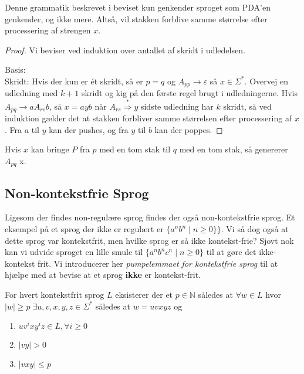 \begin{claim}
	Denne grammatik beskrevet i beviset kun genkender sproget som PDA'en genkender, og ikke mere. Altså, vil stakken forblive samme størrelse efter processering af strengen $x$.
\end{claim}

\begin{proof}
	Vi beviser ved induktion over antallet af skridt i udledelsen.

	Basis:\\ %
	 Skridt: Hvis der kun er ét skridt, så er $p = q$ og $A_{pp} \rightarrow \varepsilon$ så $x \in \Sigma^{*}$.
	Overvej en udledning med $k+1$ skridt og kig på den første regel brugt i udledningerne. Hvis $A_{pq} \rightarrow aA_{rs}b$, så $x = ayb$ når $A_{rs} \stackrel{*}{\Rightarrow} y$ sidste udledning har $k$ skridt, så ved induktion gælder det at stakken forbliver samme størrelsen efter processering af $x$. Fra $a$ til $y$ kan der pushes, og fra $y$ til $b$ kan der poppes.
\end{proof}

\begin{claim}
	Hvis $x$ kan bringe $P$ fra $p$ med en tom stak til $q$ med en tom stak, så genererer $A_{pq}$ x.
\end{claim}




\newpage
\subsection{Non-kontekstfrie Sprog}%
\label{subsec:noncfl}

Ligesom der findes non-regulære sprog findes der også non-kontekstfrie sprog. Et eksempel på et sprog der ikke er regulært er $\{a^{n}b^{n} \;|\; n \ge 0\}\}$. Vi så dog også at dette sprog var kontekstfrit, men hvilke sprog er så ikke kontekst-frie? Sjovt nok kan vi udvide sproget en lille smule til $\{a^{n}b^{n}c^{n} \;|\; n \ge 0\}$ til at gøre det ikke-kontekst frit. Vi introducerer her \textit{pumpelemmaet for kontekstfrie sprog} til at hjælpe med at bevise at et sprog \textbf{ikke} er kontekst-frit.

\begin{theorem}
	\label{teo:pumpelemmacfg}
	For hvert kontekstfrit sprog $L$ eksisterer der et $p \in \mathbb{N}$ således at $\forall w \in L$ hvor $|w| \geq p\; \exists u,v,x,y,z \in \Sigma^{*}$ således at $w = uvxyz$ og
	\begin{enumerate}
		\item $uv^{i}xy^{i}z \in L, \forall i \ge 0$
		\item $|vy| > 0$
		\item $|vxy| \le p$
	\end{enumerate}
\end{theorem}

